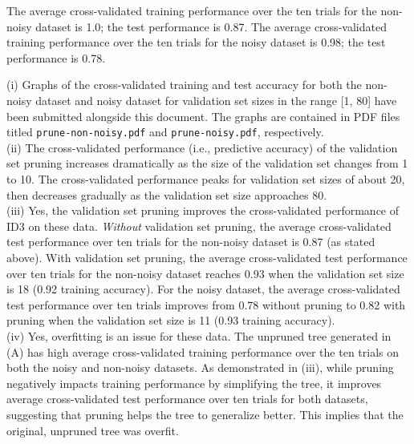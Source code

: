\documentclass[solution, letterpaper]{cs121}
\begin{document}
\subproblem The average cross-validated training performance over the ten trials for the non-noisy dataset is 1.0; the test performance is 0.87. The average cross-validated training performance over the ten trials for the noisy dataset is 0.98; the test performance is 0.78.
\pagebreak
\subproblem
 
(i) Graphs of the cross-validated training and test accuracy for both the non-noisy dataset and noisy dataset for validation set sizes in the range [1, 80] have been submitted alongside this document. The graphs are contained in PDF files titled {\tt prune-non-noisy.pdf} and {\tt prune-noisy.pdf}, respectively. \\

(ii) The cross-validated performance (i.e., predictive accuracy) of the validation set pruning increases dramatically as the size of the validation set changes from 1 to 10. The cross-validated performance peaks for validation set sizes of about 20, then decreases gradually as the validation set size approaches 80. \\

(iii) Yes, the validation set pruning improves the cross-validated performance of ID3 on these data. \emph{Without} validation set pruning, the average cross-validated test performance over ten trials for the non-noisy dataset is 0.87 (as stated above). With validation set pruning, the average cross-validated test performance over ten trials for the non-noisy dataset reaches 0.93 when the validation set size is 18 (0.92 training accuracy). For the noisy dataset, the average cross-validated test performance over ten trials improves from 0.78 without pruning to 0.82 with pruning when the validation set size is 11 (0.93 training accuracy). \\

(iv) Yes, overfitting is an issue for these data. The unpruned tree generated in (A) has high average cross-validated training performance over the ten trials on both the noisy and non-noisy datasets. As demonstrated in (iii), while pruning negatively impacts training performance by simplifying the tree, it improves average cross-validated test performance over ten trials for both datasets, suggesting that pruning helps the tree to generalize better. This implies that the original, unpruned tree was overfit.

\end{document}

